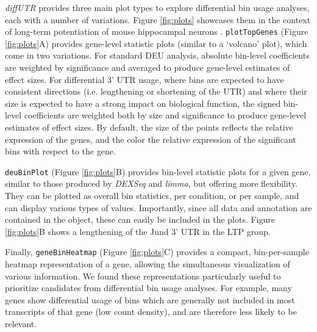 \documentclass{bmcart}
\begin{document}
\textit{diffUTR} provides three main plot types to explore differential bin usage analyses, each with a number of variations. Figure \ref{fig:plots} showcases them in the context of long-term potentiation of mouse hippocampal neurons \cite{Fontes2017Activity-DependentPotentiation}. \texttt{plotTopGenes} (Figure \ref{fig:plots}A) provides gene-level statistic plots (similar to a `volcano' plot), which come in two variations. For standard DEU analysis, absolute bin-level coefficients are weighted by significance and averaged to produce gene-level estimates of effect sizes. For differential 3' UTR usage, where bins are expected to have consistent directions (i.e. lengthening or shortening of the UTR) and where their size is expected to have a strong impact on biological function, the signed bin-level coefficients are weighted both by size and significance to produce gene-level estimates of effect sizes. By default, the size of the points reflects the relative expression of the genes, and the color the relative expression of the significant bins with respect to the gene.

\texttt{deuBinPlot} (Figure \ref{fig:plots}B) provides bin-level statistic plots for a given gene, similar to those produced by \textit{DEXSeq} and \textit{limma}, but offering more flexibility. They can be plotted as overall bin statistics, per condition, or per sample, and can display various types of values. Importantly, since all data and annotation are contained in the object, these can easily be included in the plots. Figure \ref{fig:plots}B shows a lengthening of the Jund 3' UTR in the LTP group.

Finally, \texttt{geneBinHeatmap} (Figure \ref{fig:plots}C) provides a compact, bin-per-sample heatmap representation of a gene, allowing the simultaneous visualization of various information. We found these representations particularly useful to prioritize candidates from differential bin usage analyses. For example, many genes show differential usage of bins which are generally not included in most transcripts of that gene (low count density), and are therefore less likely to be relevant. 
\end{document}
